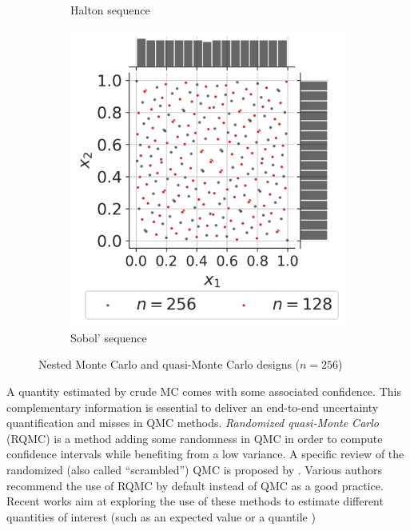 \begin{figure}[ht]
\begin{subfigure}[b]{0.32\textwidth}
        \caption{Halton sequence}
    \end{subfigure}
    \hfill
    \begin{subfigure}[b]{0.32\textwidth}
        \centering
        \includegraphics[width=\textwidth]{../numerical_experiments/chapter1/figures/quasi_MonteCarlo_256.png}
        \caption{Sobol' sequence}
    \end{subfigure}
       \caption{Nested Monte Carlo and quasi-Monte Carlo designs ($n=256$)}
       \label{fig:quasi_monte_carlo_designs}
\end{figure}

A quantity estimated by crude MC comes with some associated confidence. 
This complementary information is essential to deliver an end-to-end uncertainty quantification and misses in QMC methods.  
\textit{Randomized quasi-Monte Carlo} (RQMC) is a method adding some randomness in QMC in order to compute confidence intervals while benefiting from a low variance.
A specific review of the randomized (also called ``scrambled'') QMC is proposed by \citet{lecuyer_2018}. Various authors recommend the use of RQMC by default instead of QMC as a good practice. 
Recent works aim at exploring the use of these methods to estimate different quantities of interest (such as an expected value \citep{gobet_2022} or a quantile \citep{tuffin_2019})

